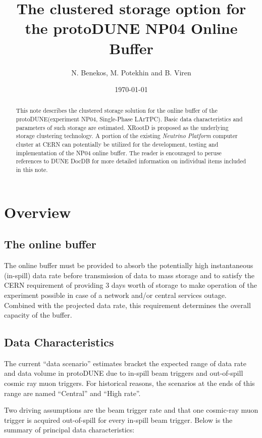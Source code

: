\documentclass[pdftex,12pt,letter]{article}
\title{The clustered storage option for the protoDUNE NP04 Online Buffer}
\date{\today}
\author{N. Benekos, M. Potekhin and B. Viren}
\newcommand{\pd}{protoDUNE\xspace}
\newcommand{\xrd}{XRootD\xspace}
\begin{document}
\maketitle

\begin{abstract}
\noindent  This note describes the clustered storage
solution for the online buffer of the \pd (experiment NP04, Single-Phase LArTPC).
Basic data characteristics and  parameters of such storage are estimated. \xrd is proposed as the underlying
storage clustering technology. A portion of the existing   \textit{Neutrino Platform} computer cluster at CERN
can potentially be utilized for the development, testing and  implementation of the NP04 online buffer.  The reader
is encouraged to peruse  references to DUNE DocDB for more detailed information on individual
items included in this note.
\end{abstract}

\section{Overview}
\subsection{The online buffer}
The online buffer must be provided to absorb the potentially high instantaneous (in-spill) data rate before transmission
of data to mass storage and to satisfy the CERN requirement of providing 3 days worth of storage to make operation
of the experiment possible in case of a network and/or central services outage. Combined with the projected data
rate, this requirement determines the overall capacity of the buffer.

\subsection{Data Characteristics}

The current ``data scenario'' estimates \cite{docdb1086} bracket the expected range of data rate
and data volume in \pd \cite{docdb186} due to in-spill beam triggers and out-of-spill cosmic ray muon triggers.
For historical reasons, the scenarios at the ends of this range are named ``Central'' and ``High rate''.

Two driving assumptions are the beam trigger rate and that one
cosmic-ray muon trigger is acquired out-of-spill for every in-spill
beam trigger.  Below is the summary of principal data characteristics:
\end{document}
